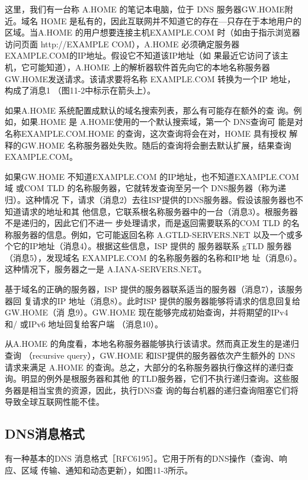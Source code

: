 这里，我们有一台称 A.HOME 的笔记本电脑，位于 DNS 服务器GW.HOME附近。域名
HOME 是私有的，因此互联网并不知道它的存在—只存在于本地用户的区域。当A.HOME
的用户想要连接主机EXAMPLE.COM 时（如由于指示浏览器访问页面 http://EXAMPLE
COM），A.HOME 必须确定服务器EXAMPLE.COM的IP地址。假设它不知道该IP地址（如
果最近它访问了该主机，它可能知道），A.HOME 上的解析器软件首先向它的本地名称服务器
GW.HOME发送请求。该请求要将名称 EXAMPLE.COM 转换为一个IP 地址，构成了消息1
（图11-2中标示在箭头上）。

\begin{tcolorbox}
    如果A.HOME 系统配置成默认的域名搜索列表，那么有可能存在额外的查
    询。例如，如果.HOME 是 A.HOME使用的一个默认搜索域，第一个 DNS查询可
    能是对名称EXAMPLE.COM.HOME 的查询，这次查询将会在对，HOME 具有授权
    解释的GW.HOME 名称服务器处失败。随后的查询将会删去默认扩展，结果查询
    EXAMPLE.COM。
\end{tcolorbox}

如果GW.HOME 不知道EXAMPLE.COM 的IP地址，也不知道EXAMPLE.COM域
或COM TLD 的名称服务器，它就转发查询至另一个 DNS服务器（称为递归）。这种情况
下，请求（消息2）去往ISP提供的DNS服务器。假设该服务器也不知道请求的地址和其
他信息，它联系根名称服务器中的一台（消息3）。根服务器不是递归的，因此它们不进一
步处理请求，而是返回需要联系的COM TLD 的名称服务器的信息。例如，它可能返回名称
A.GTLD-SERVERS.NET 以及一个或多个它的IP地址（消息4）。根据这些信息，ISP 提供的
服务器联系 gTLD 服务器（消息5），发现域名 EXAMPLE.COM 的名称服务器的名称和IP地
址（消息6）。这种情况下，服务器之一是 A.IANA-SERVERS.NET。

基于域名的正确的服务器，ISP 提供的服务器联系适当的服务器（消息7），该服务器回
复请求的IP 地址（消息8）。此时ISP 提供的服务器能够将请求的信息回复给GW.HOME（消
息9）。GW.HOME 现在能够完成初始查询，并将期望的IPv4 和/ 或IPv6 地址回复给客户端
（消息10）。

从A.HOME 的角度看，本地名称服务器能够执行该请求。然而真正发生的是递归查询
（recursive query），GW.HOME 和ISP提供的服务器依次产生额外的 DNS 请求来满足 A.HOME
的查询。总之，大部分的名称服务器执行像这样的递归查询。明显的例外是根服务器和其他
的TLD服务器，它们不执行递归查询。这些服务器是相当宝贵的资源，因此，执行DNS查
询的每台机器的递归查询阻塞它们将导致全球互联网性能不佳。

\subsection{DNS消息格式}

有一种基本的DNS 消息格式［RFC6195］。它用于所有的DNS操作（查询、响应、区域
传输、通知和动态更新），如图11-3所示。

